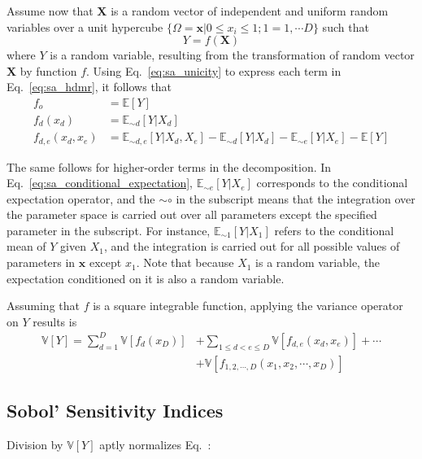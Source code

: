 Assume now that $\mathbf{X}$ is a random vector of independent and uniform random variables over a unit hypercube
$\{\Omega = \mathbf{x} | 0 \leq x_i  \leq 1; 1 = 1,\cdots D\}$ such that
\begin{equation}
	Y = f(\mathbf{X})
\label{eq:sa_random_function}
\end{equation}
where $Y$ is a random variable, resulting from the transformation of random vector $\mathbf{X}$ by function $f$.
Using Eq.~\ref{eq:sa_unicity} to express each term in Eq.~\ref{eq:sa_hdmr}, it follows that
\begin{equation}
	\begin{split}
		f_o & = \mathbb{E}[Y] \\
	  f_d(x_d) & = \mathbb{E}_{\sim d}[Y|X_d] \\
    f_{d,e}(x_d,x_e) & = \mathbb{E}_{\sim d,e} [Y|X_d, X_e] - \mathbb{E}_{\sim d}[Y|X_d] - \mathbb{E}_{\sim e}[Y|X_e] - \mathbb{E}[Y] 
	\end{split}
\label{eq:sa_conditional_expectation}
\end{equation}

The same follows for higher-order terms in the decomposition. 
In Eq.~\ref{eq:sa_conditional_expectation}, $\mathbb{E}_{\sim e} [Y|X_e]$ corresponds to the conditional expectation operator,
and the $\sim\circ$ in the subscript means that the integration over the parameter space is carried out over all parameters except the specified parameter in the subscript.
For instance, $\mathbb{E}_{\sim 1} [Y|X_1]$ refers to the conditional mean of $Y$ given $X_1$, and the integration is carried out for all possible values of parameters in $\mathbf{x}$ except $x_1$.
Note that because $X_1$ is a random variable, the expectation conditioned on it is also a random variable.

Assuming that $f$ is a square integrable function, applying the variance operator on $Y$ results is
\begin{equation}
	\begin{split}
		\mathbb{V}[Y] = \sum_{d=1}^{D} \mathbb{V}[f_d (x_D)] & + \sum_{1 \leq d < e \leq D} \mathbb{V} [f_{d,e} (x_d, x_e)] + \cdots \\
	                                                       & + \mathbb{V} [f_{1,2,\cdots,D} (x_1, x_2, \cdots, x_D)]
		\end{split}
\label{eq:sa_variance_decomposition}
\end{equation}

\subsection{Sobol' Sensitivity Indices}\label{sub:sa_sobol_indices}

Division by $\mathbb{V}[Y]$ aptly normalizes Eq.~:


